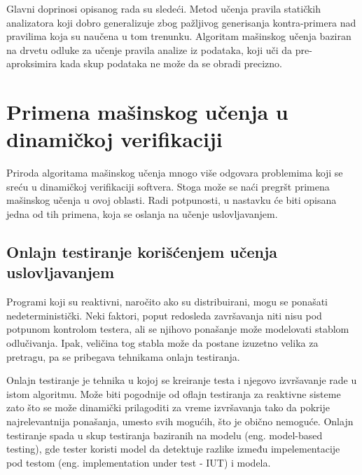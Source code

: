 \documentclass[a4paper]{article}
\theoremstyle{definition}
\begin{document}
{%
Glavni doprinosi opisanog rada su sledeći. Metod učenja pravila statičkih 
analizatora koji dobro generalizuje zbog pažljivog generisanja kontra-primera 
nad pravilima koja su naučena u tom trenunku. Algoritam mašinskog učenja baziran 
na drvetu odluke za učenje pravila analize iz podataka, koji uči da 
pre-aproksimira kada skup podataka ne može da se obradi precizno. 


\section{Primena mašinskog učenja u dinamičkoj verifikaciji}
\label{sec:dinamcikaPrimena}

Priroda algoritama mašinskog učenja mnogo više odgovara problemima koji se sreću 
u dinamičkoj verifikaciji softvera. Stoga može se naći pregršt primena mašinskog 
učenja u ovoj oblasti. Radi potpunosti, u nastavku će biti opisana jedna od tih 
primena, koja se oslanja na učenje uslovljavanjem.


\subsection{Onlajn testiranje korišćenjem učenja uslovljavanjem }

Programi koji su reaktivni, naročito ako su distribuirani, mogu se ponašati nedeterministički. Neki faktori, poput redosleda završavanja niti nisu pod potpunom kontrolom testera, ali se njihovo ponašanje može modelovati stablom odlučivanja. Ipak, veličina tog stabla može da postane izuzetno velika za pretragu, pa se pribegava tehnikama onlajn testiranja.

Onlajn testiranje je tehnika u kojoj se kreiranje testa i njegovo izvršavanje rade u istom algoritmu. Može biti pogodnije od oflajn testiranja za reaktivne sisteme zato što se može dinamički prilagoditi za vreme izvršavanja tako da pokrije najrelevantnija ponašanja, umesto svih mogućih, što je obično nemoguće. Onlajn testiranje spada u skup testiranja baziranih na modelu (eng. model-based testing), gde tester koristi model da detektuje razlike između impelementacije pod testom (eng. implementation under test - IUT) i modela.

}
\end{document}
